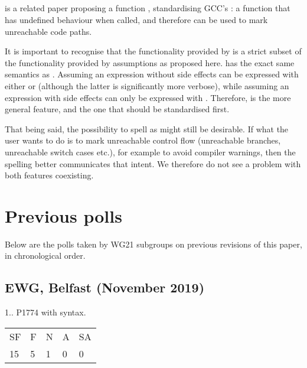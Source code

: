 \subsection{}

\cite{P0627R6} is a related paper proposing a function , standardising GCC's : a function that has undefined behaviour when called, and therefore can be used to mark unreachable code paths.

It is important to recognise that the functionality provided by  is a strict subset of the functionality provided by assumptions as proposed here.  has the exact same semantics as . Assuming an expression without side effects can be expressed with either  or  (although the latter is significantly more verbose), while assuming an expression with side effects can only be expressed with . Therefore,  is the more general feature, and the one that should be standardised first.

That being said, the possibility to spell  as  might still be desirable. If 
what the user wants to do is to mark unreachable control flow (unreachable branches, unreachable switch cases etc.), for example to avoid compiler warnings, then the spelling  better communicates that intent. We therefore do not see a problem with both features coexisting.

\section {Previous polls}
\label{sec:polls}

Below are the polls taken by WG21 subgroups on previous revisions of this paper, in chronological order.


\subsection*{EWG, Belfast (November 2019)}

1.. P1774 with  syntax.

\hspace{6mm}
\begin{tabular}{lllll}
SF & F & N & A & SA \\
15 & 5 & 1 & 0 & 0
\end{tabular}

